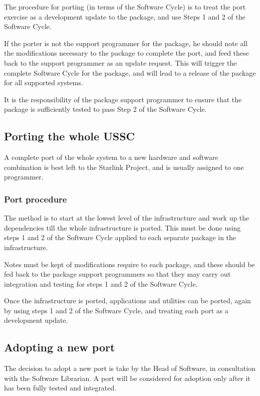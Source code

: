 The procedure for porting (in terms of the Software Cycle) is to treat 
the port exercise as a development update to the package, and use Steps
1 and 2 of the Software Cycle.  

If the porter is not the support programmer for the package, he should
note all the modifications necessary to the package to complete the
port, and feed these back to the support programmer as an update
request. This will trigger the complete Software Cycle for the package,
and will lead to a release of the package for all supported systems.

It is the responsibility of the package support programmer to ensure that
the package is sufficiently tested to pass Step 2 of the Software Cycle.

\subsection{\label{porting_the_whole_ussc}Porting the whole USSC}

A complete port of the whole system to a new hardware and software
combination is best left to the Starlink Project, and is usually
assigned to one programmer.  

\subsubsection{Port procedure}

The method is to start at the lowest level of the infrastructure and
work up the dependencies till the whole infrastructure is ported.
This must be done using steps 1 and 2 of the Software Cycle applied
to each separate package in the infrastructure.  

Notes must be kept of modifications require to each package, and these
should be fed back to the package support programmers so that they may
carry out integration and testing for steps 1 and 2 of the Software
Cycle.

Once the infrastructure is ported, applications and utilities can be
ported, again by using steps 1 and 2 of the Software Cycle, and
treating each port as a development update.

\subsection{\label{adpopting_a_new_port}Adopting a new port}

The decision to adopt a new port is take by the Head of Software, in
consultation with the Software Librarian.  A port will be considered
for adoption only after it has been fully tested and integrated.

